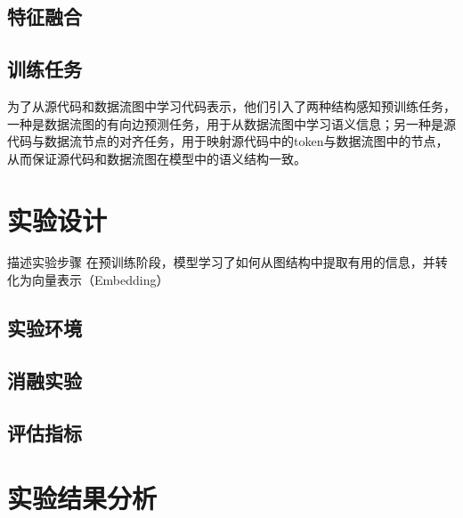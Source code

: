 \subsection{特征融合}

\subsection{训练任务}
为了从源代码和数据流图中学习代码表示，他们引入了两种结构感知预训练任务，一种是数据流图的有向边预测任务，用于从数据流图中学习语义信息；另一种是源代码与数据流节点的对齐任务，用于映射源代码中的token与数据流图中的节点，从而保证源代码和数据流图在模型中的语义结构一致。
\section{实验设计}
描述实验步骤
在预训练阶段，模型学习了如何从图结构中提取有用的信息，并转化为向量表示（Embedding）

\subsection{实验环境}

\subsection{消融实验}

\subsection{评估指标}

\section{实验结果分析}
